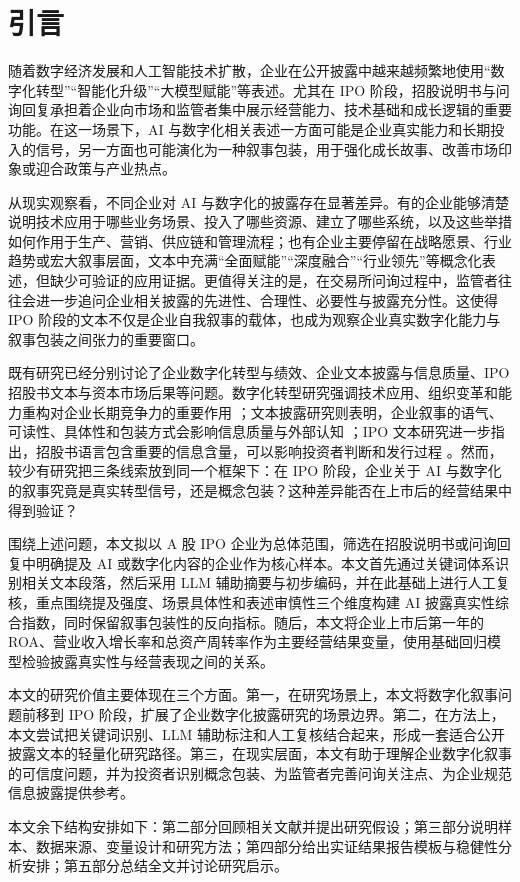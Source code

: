 \section{引言}

随着数字经济发展和人工智能技术扩散，企业在公开披露中越来越频繁地使用“数字化转型”“智能化升级”“大模型赋能”等表述。尤其在 IPO 阶段，招股说明书与问询回复承担着企业向市场和监管者集中展示经营能力、技术基础和成长逻辑的重要功能。在这一场景下，AI 与数字化相关表述一方面可能是企业真实能力和长期投入的信号，另一方面也可能演化为一种叙事包装，用于强化成长故事、改善市场印象或迎合政策与产业热点。

从现实观察看，不同企业对 AI 与数字化的披露存在显著差异。有的企业能够清楚说明技术应用于哪些业务场景、投入了哪些资源、建立了哪些系统，以及这些举措如何作用于生产、营销、供应链和管理流程；也有企业主要停留在战略愿景、行业趋势或宏大叙事层面，文本中充满“全面赋能”“深度融合”“行业领先”等概念化表述，但缺少可验证的应用证据。更值得关注的是，在交易所问询过程中，监管者往往会进一步追问企业相关披露的先进性、合理性、必要性与披露充分性。这使得 IPO 阶段的文本不仅是企业自我叙事的载体，也成为观察企业真实数字化能力与叙事包装之间张力的重要窗口。

既有研究已经分别讨论了企业数字化转型与绩效、企业文本披露与信息质量、IPO 招股书文本与资本市场后果等问题。数字化转型研究强调技术应用、组织变革和能力重构对企业长期竞争力的重要作用 \citep{Vial_2019,Verhoef_2021,Warner_2019}；文本披露研究则表明，企业叙事的语气、可读性、具体性和包装方式会影响信息质量与外部认知 \citep{Healy_2001,LOUGHRAN_2016,Li_2008,Huang2014,MerklDaviesConcept2011}；IPO 文本研究进一步指出，招股书语言包含重要的信息含量，可以影响投资者判断和发行过程 \citep{Hanley_2010,Loughran_2013}。然而，较少有研究把三条线索放到同一个框架下：在 IPO 阶段，企业关于 AI 与数字化的叙事究竟是真实转型信号，还是概念包装？这种差异能否在上市后的经营结果中得到验证？

围绕上述问题，本文拟以 A 股 IPO 企业为总体范围，筛选在招股说明书或问询回复中明确提及 AI 或数字化内容的企业作为核心样本。本文首先通过关键词体系识别相关文本段落，然后采用 LLM 辅助摘要与初步编码，并在此基础上进行人工复核，重点围绕提及强度、场景具体性和表述审慎性三个维度构建 AI 披露真实性综合指数，同时保留叙事包装性的反向指标。随后，本文将企业上市后第一年的 ROA、营业收入增长率和总资产周转率作为主要经营结果变量，使用基础回归模型检验披露真实性与经营表现之间的关系。

本文的研究价值主要体现在三个方面。第一，在研究场景上，本文将数字化叙事问题前移到 IPO 阶段，扩展了企业数字化披露研究的场景边界。第二，在方法上，本文尝试把关键词识别、LLM 辅助标注和人工复核结合起来，形成一套适合公开披露文本的轻量化研究路径。第三，在现实层面，本文有助于理解企业数字化叙事的可信度问题，并为投资者识别概念包装、为监管者完善问询关注点、为企业规范信息披露提供参考。

本文余下结构安排如下：第二部分回顾相关文献并提出研究假设；第三部分说明样本、数据来源、变量设计和研究方法；第四部分给出实证结果报告模板与稳健性分析安排；第五部分总结全文并讨论研究启示。

